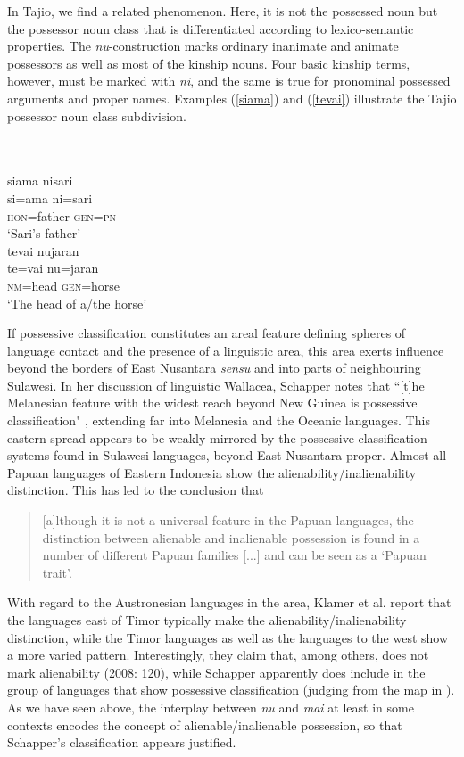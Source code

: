 In Tajio, we find a related phenomenon. Here, it is not the possessed noun but the possessor noun class that is differentiated according to lexico-semantic properties. The \textit{nu}-construction marks ordinary inanimate and animate possessors as well as most of the kinship nouns. Four basic kinship terms, however, must be marked with \textit{ni}, and the same is true for pronominal possessed arguments and proper names. Examples (\ref{siama}) and (\ref{tevai}) illustrate the Tajio possessor noun class subdivision.

\ea
{}\\
\\
\ea \label{siama}
\glll siama nisari \\
si=ama ni=sari\\
\textsc{hon}=father \textsc{gen}=\textsc{pn}\\
\glt ‘Sari's father’
\ex \label{tevai}
\langinfo{}{}{\citealt[]{}}\\
\gll tevai nujaran \\
te=vai nu=jaran\\
\textsc{nm}=head \textsc{gen}=horse\\
\glt ‘The head of a/the horse’
\z
\z

If possessive classification constitutes an areal feature defining spheres of language contact and the presence of a linguistic area, this area exerts influence beyond the borders of East Nusantara \textit{sensu} \citet{klamer2008east} and into parts of neighbouring Sulawesi. In her discussion of linguistic Wallacea, Schapper notes that ``[t]he Melanesian feature with the widest reach beyond New Guinea is possessive classification" \citep[108]{schapper2015wallacea}, extending far into Melanesia and the Oceanic languages. This eastern spread appears to be weakly mirrored by the possessive classification systems found in Sulawesi languages, beyond East Nusantara proper. Almost all Papuan languages of Eastern Indonesia show the alienability/inalienability distinction. This has led \citet[120]{klamer2008east} to the conclusion that

\begin{quote}[a]lthough it is not a universal feature in the Papuan languages,
the distinction between alienable and inalienable possession is found in a number of different Papuan families [...] and can be seen as a `Papuan trait’.\end{quote}

With regard to the Austronesian languages in the area, Klamer et al. report that the languages east of Timor typically make the alienability/inalienability distinction, while the Timor languages as well as the languages to the west show a more varied pattern. Interestingly, they claim that, among others,  does not mark alienability (2008: 120), while Schapper apparently does include  in the group of languages that show possessive classification (judging from the map in \citealt[110]{schapper2009bunaq}). As we have seen above, the interplay between \textit{nu} and \textit{mai} at least in some contexts encodes the concept of alienable/inalienable possession, so that Schapper's classification appears justified.

